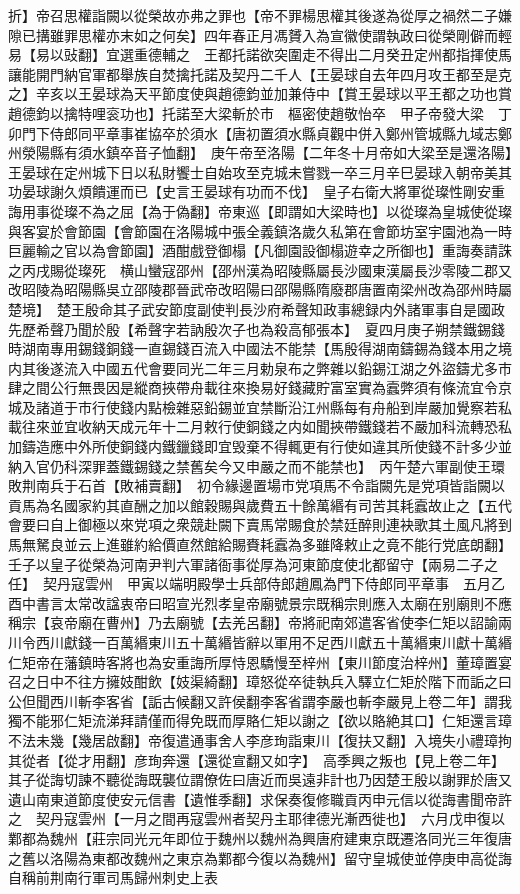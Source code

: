 折】帝召思權詣闕以從榮故亦弗之罪也【帝不罪楊思權其後遂為從厚之禍然二子嫌隙已搆雖罪思權亦末如之何矣】四年春正月馮贇入為宣徽使謂執政曰從榮剛僻而輕易【易以䜴翻】宜選重德輔之　王都托諾欲突圍走不得出二月癸丑定州都指揮使馬讓能開門納官軍都舉族自焚擒托諾及契丹二千人【王晏球自去年四月攻王都至是克之】辛亥以王晏球為天平節度使與趙德鈞並加兼侍中【賞王晏球以平王都之功也賞趙德鈞以擒特哩衮功也】托諾至大梁斬於市　樞密使趙敬怡卒　甲子帝發大梁　丁卯門下侍郎同平章事崔協卒於須水【唐初置須水縣貞觀中併入鄭州管城縣九域志鄭州滎陽縣有須水鎮卒音子恤翻】　庚午帝至洛陽【二年冬十月帝如大梁至是還洛陽】　王晏球在定州城下日以私財饗士自始攻至克城未嘗戮一卒三月辛巳晏球入朝帝美其功晏球謝久煩饋運而已【史言王晏球有功而不伐】　皇子右衛大將軍從璨性剛安重誨用事從璨不為之屈【為于偽翻】帝東巡【即謂如大梁時也】以從璨為皇城使從璨與客宴於會節園【會節園在洛陽城中張全義鎮洛歲久私第在會節坊室宇園池為一時巨麗輸之官以為會節園】酒酣戲登御榻【凡御園設御榻遊幸之所御也】重誨奏請誅之丙戌賜從璨死　横山蠻寇邵州【邵州漢為昭陵縣屬長沙國東漢屬長沙零陵二郡又改昭陵為昭陽縣吳立邵陵郡晉武帝改昭陽曰邵陽縣隋廢郡唐置南梁州改為邵州時屬楚境】　楚王殷命其子武安節度副使判長沙府希聲知政事總録内外諸軍事自是國政先歷希聲乃聞於殷【希聲字若訥殷次子也為殺高郁張本】　夏四月庚子朔禁鐵錫錢時湖南專用錫錢銅錢一直錫錢百流入中國法不能禁【馬殷得湖南鑄錫為錢本用之境内其後遂流入中國五代會要同光二年三月勅泉布之弊雜以鉛錫江湖之外盜鑄尤多市肆之間公行無畏因是縱商挾帶舟載往來換易好錢藏貯富室實為蠧弊須有條流宜令京城及諸道于市行使錢内點檢雜惡鉛錫並宜禁斷沿江州縣每有舟船到岸嚴加覺察若私載往來並宜收納天成元年十二月敕行使銅錢之内如聞挾帶鐵錢若不嚴加科流轉恐私加鑄造應中外所使銅錢内鐵鑞錢即宜毁棄不得輒更有行使如違其所使錢不計多少並納入官仍科深罪蓋鐵錫錢之禁舊矣今又申嚴之而不能禁也】　丙午楚六軍副使王環敗荆南兵于石首【敗補賣翻】　初令緣邊置場市党項馬不令詣闕先是党項皆詣闕以貢馬為名國家約其直酬之加以館穀賜與歲費五十餘萬緡有司苦其耗蠧故止之【五代會要曰自上御極以來党項之衆競赴闕下賣馬常賜食於禁廷醉則連袂歌其土風凡將到馬無駑良並云上進雖約給價直然館給賜賚耗蠧為多雖降敕止之竟不能行党底朗翻】　壬子以皇子從榮為河南尹判六軍諸衙事從厚為河東節度使北都留守【兩易二子之任】　契丹寇雲州　甲寅以端明殿學士兵部侍郎趙鳳為門下侍郎同平章事　五月乙酉中書言太常改諡衷帝曰昭宣光烈孝皇帝廟號景宗既稱宗則應入太廟在别廟則不應稱宗【哀帝廟在曹州】乃去廟號【去羌呂翻】帝將祀南郊遣客省使李仁矩以詔諭兩川令西川獻錢一百萬緡東川五十萬緡皆辭以軍用不足西川獻五十萬緡東川獻十萬緡仁矩帝在藩鎮時客將也為安重誨所厚恃恩驕慢至梓州【東川節度治梓州】董璋置宴召之日中不往方擁妓酣飲【妓渠綺翻】璋怒從卒徒執兵入驛立仁矩於階下而詬之曰公但聞西川斬李客省【詬古候翻又許侯翻李客省謂李嚴也斬李嚴見上卷二年】謂我獨不能邪仁矩流涕拜請僅而得免既而厚賂仁矩以謝之【欲以賂絶其口】仁矩還言璋不法未幾【幾居啟翻】帝復遣通事舍人李彦珣詣東川【復扶又翻】入境失小禮璋拘其從者【從才用翻】彦珣奔還【還從宣翻又如字】　高季興之叛也【見上卷二年】其子從誨切諫不聽從誨既襲位謂僚佐曰唐近而吳遠非計也乃因楚王殷以謝罪於唐又遺山南東道節度使安元信書【遺惟季翻】求保奏復修職貢丙申元信以從誨書聞帝許之　契丹寇雲州【一月之間再寇雲州者契丹主耶律德光漸西徙也】　六月戊申復以鄴都為魏州【莊宗同光元年即位于魏州以魏州為興唐府建東京既遷洛同光三年復唐之舊以洛陽為東都改魏州之東京為鄴都今復以為魏州】留守皇城使並停庚申高從誨自稱前荆南行軍司馬歸州刺史上表

